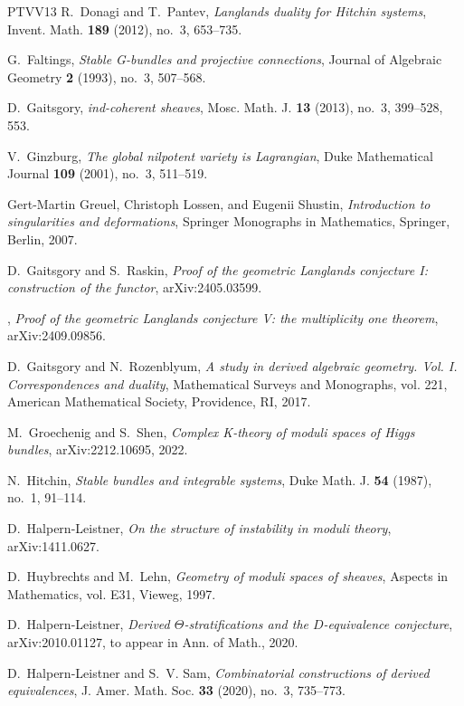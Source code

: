 \documentclass[11pt,oneside,a4paper,mathscr]{amsart}
\theoremstyle{definition}
\begin{document}
\begin{thebibliography}{PTVV13}
R.~Donagi and T.~Pantev, \emph{Langlands duality for {H}itchin systems}, Invent. Math. \textbf{189} (2012), no.~3, 653--735.

G.~Faltings, \emph{Stable {G}-bundles and projective connections}, Journal of Algebraic Geometry \textbf{2} (1993), no.~3, 507--568.

D.~Gaitsgory, \emph{ind-coherent sheaves}, Mosc. Math. J. \textbf{13} (2013), no.~3, 399--528, 553.

V.~Ginzburg, \emph{The global nilpotent variety is {L}agrangian}, Duke Mathematical Journal \textbf{109} (2001), no.~3, 511--519.

Gert-Martin Greuel, Christoph Lossen, and Eugenii Shustin, \emph{Introduction to singularities and deformations}, Springer Monographs in Mathematics, Springer, Berlin, 2007.

D.~Gaitsgory and S.~Raskin, \emph{Proof of the geometric {L}anglands conjecture {I}: construction of the functor}, arXiv:2405.03599.

\bysame, \emph{Proof of the geometric {L}anglands conjecture {V}: the multiplicity one theorem}, arXiv:2409.09856.

D.~Gaitsgory and N.~Rozenblyum, \emph{A study in derived algebraic geometry. {V}ol. {I}. {C}orrespondences and duality}, Mathematical Surveys and Monographs, vol. 221, American Mathematical Society, Providence, RI, 2017.

M.~Groechenig and S.~Shen, \emph{Complex {K}-theory of moduli spaces of {H}iggs bundles}, arXiv:2212.10695, 2022.

N.~Hitchin, \emph{Stable bundles and integrable systems}, Duke Math. J. \textbf{54} (1987), no.~1, 91--114.

D.~Halpern-Leistner, \emph{On the structure of instability in moduli theory}, arXiv:1411.0627.

D.~Huybrechts and M.~Lehn, \emph{Geometry of moduli spaces of sheaves}, Aspects in Mathematics, vol. E31, Vieweg, 1997.

D.~Halpern-Leistner, \emph{Derived {$\Theta$}-stratifications and the {$D$}-equivalence conjecture}, arXiv:2010.01127, to appear in Ann. of Math., 2020.

D.~Halpern-Leistner and S.~V. Sam, \emph{Combinatorial constructions of derived equivalences}, J. Amer. Math. Soc. \textbf{33} (2020), no.~3, 735--773.


\end{thebibliography}
\end{document}
